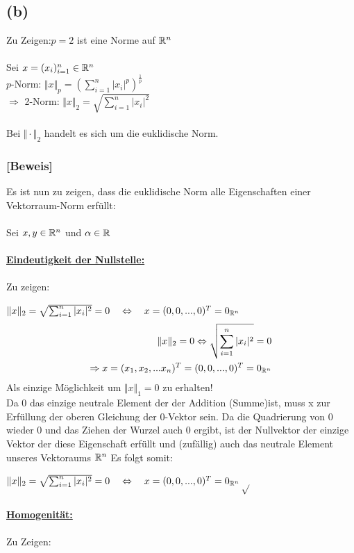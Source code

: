 \documentclass{llncs}
\begin{document}
\subsection*{(b)}
Zu Zeigen:$p=2$ ist eine Norme auf $\mathbb{R}^n$\\\\
Sei $x=(x_i)^n_{i=1}\in \mathbb{R}^n$\\
$p$-Norm: $\Vert x\Vert_p=\left( \sum^n_{i=1} |x_i|^p\right)^{\frac{1}{p}}$\\
$\Rightarrow$ 2-Norm: $\Vert x\Vert_2=\sqrt{ \sum^n_{i=1} |x_i|^2}$\\\\
Bei $\Vert\cdot\Vert_2$ handelt es sich um die euklidische Norm.
\subsubsection*{[Beweis]\\}
Es ist nun zu zeigen, dass die euklidische Norm alle Eigenschaften einer Vektorraum-Norm erfüllt:\\\\
Sei $x,y\in \mathbb{R}^n$ und $\alpha \in \mathbb{R}$\\\\
\underline{\textbf{Eindeutigkeit der Nullstelle:}}\\\\
Zu zeigen:

$\Vert x\Vert_2=\sqrt{ \sum^n_{i=1} |x_i|^2}=0\quad\Leftrightarrow\quad x=(0,0,...,0)^T=0_{\mathbb{R}^n}$
\\
\begin{align*}
\Vert x\Vert_2=0\Leftrightarrow \sqrt{ \sum^n_{i=1} |x_i|^2}=0\\
\Rightarrow x=(x_1,x_2,...x_n)^T=(0,0,...,0)^T=0_{\mathbb{R}^n}
\end{align*}
Als einzige Möglichkeit um $\Vert x \Vert_1 = 0$ zu erhalten!\\
Da 0 das einzige neutrale Element der der Addition (Summe)ist, muss x zur Erfüllung der oberen Gleichung der 0-Vektor sein. Da die Quadrierung von 0 wieder 0 und das Ziehen der Wurzel auch 0 ergibt, ist der Nullvektor der einzige Vektor der diese Eigenschaft erfüllt und (zufällig) auch das neutrale Element unseres Vektoraums $\mathbb{R}^n$ 
Es folgt somit:

$\Vert x\Vert_2=\sqrt{ \sum^n_{i=1} |x_i|^2}=0\quad\Leftrightarrow\quad x=(0,0,...,0)^T=0_{\mathbb{R}^n}$\hfill$\sqrt{}$\\\\
\underline{\textbf{Homogenität:}}\\\\
Zu Zeigen:
\end{document}
